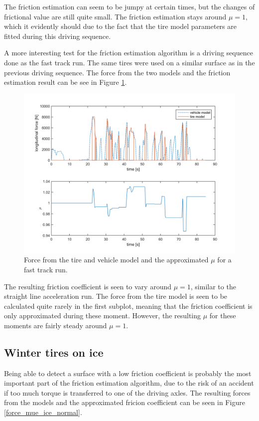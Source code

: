 The friction estimation can seem to be jumpy at certain times, but the changes of frictional value are still quite small. The friction estimation stays around $ \mu = 1 $, which it evidently should due to the fact that the tire model parameters are fitted during this driving sequence.  

A more interesting test for the friction estimation algorithm is a driving sequence done as the fast track run. The same tires were used on a similar surface as in the previous driving sequence. The force from the two models and the friction estimation result can be see in Figure \ref{force_mue_race}. 

\begin{figure}[h]
	\centering
	\includegraphics[width=1.0\textwidth]{Pictures/force_mue_race}
	\caption {Force from the tire and vehicle model and the approximated $ \mu $ for a fast track run.}
	\label{force_mue_race}
\end{figure}

The resulting friction coefficient is seen to vary around $ \mu = 1 $, similar to the straight line acceleration run. The force from the tire model is seen to be calculated quite rarely in the first subplot, meaning that the friction coefficient is only approximated during these moment. However, the resulting $ \mu $ for these moments are fairly steady around $ \mu = 1 $. 

\subsection{Winter tires on ice}
Being able to detect a surface with a low friction coefficient is probably the most important part of the friction estimation algorithm, due to the risk of an accident if too much torque is transferred to one of the driving axles. The resulting forces from the models and the approximated fricion coefficient can be seen in Figure \ref{force_mue_ice_normal}.

